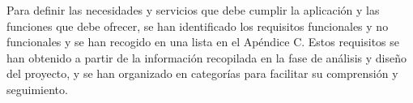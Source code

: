 Para definir las necesidades y servicios que debe cumplir la aplicación y las funciones que debe ofrecer, se han identificado los requisitos funcionales y no funcionales y se han recogido en una lista en el Apéndice C.
Estos requisitos se han obtenido a partir de la información recopilada en la fase de análisis y diseño del proyecto, y se han organizado en categorías para facilitar su comprensión y seguimiento.